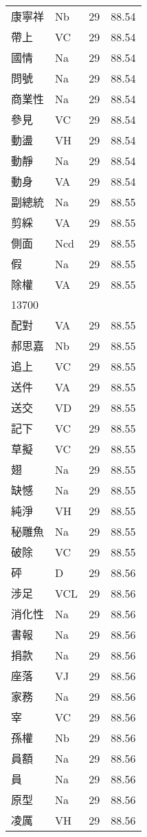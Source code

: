 \documentclass[twocolumn]{book}
\begin{document}
\begin{supertabular}{llrr}
康寧祥 & Nb & 29 &  88.54\\
帶上 & VC & 29 &  88.54\\
國情 & Na & 29 &  88.54\\
問號 & Na & 29 &  88.54\\
商業性 & Na & 29 &  88.54\\
參見 & VC & 29 &  88.54\\
動盪 & VH & 29 &  88.54\\
動靜 & Na & 29 &  88.54\\
動身 & VA & 29 &  88.54\\
副總統 & Na & 29 &  88.55\\
剪綵 & VA & 29 &  88.55\\
側面 & Ncd & 29 &  88.55\\
假 & Na & 29 &  88.55\\
除權 & VA & 29 &  88.55\\
13700\\
配對 & VA & 29 &  88.55\\
郝思嘉 & Nb & 29 &  88.55\\
追上 & VC & 29 &  88.55\\
送件 & VA & 29 &  88.55\\
送交 & VD & 29 &  88.55\\
記下 & VC & 29 &  88.55\\
草擬 & VC & 29 &  88.55\\
翅 & Na & 29 &  88.55\\
缺憾 & Na & 29 &  88.55\\
純淨 & VH & 29 &  88.55\\
秘雕魚 & Na & 29 &  88.55\\
破除 & VC & 29 &  88.55\\
砰 & D & 29 &  88.56\\
涉足 & VCL & 29 &  88.56\\
消化性 & Na & 29 &  88.56\\
書報 & Na & 29 &  88.56\\
捐款 & Na & 29 &  88.56\\
座落 & VJ & 29 &  88.56\\
家務 & Na & 29 &  88.56\\
宰 & VC & 29 &  88.56\\
孫權 & Nb & 29 &  88.56\\
員額 & Na & 29 &  88.56\\
員 & Na & 29 &  88.56\\
原型 & Na & 29 &  88.56\\
凌厲 & VH & 29 &  88.56\\

\end{supertabular}
\end{document}

